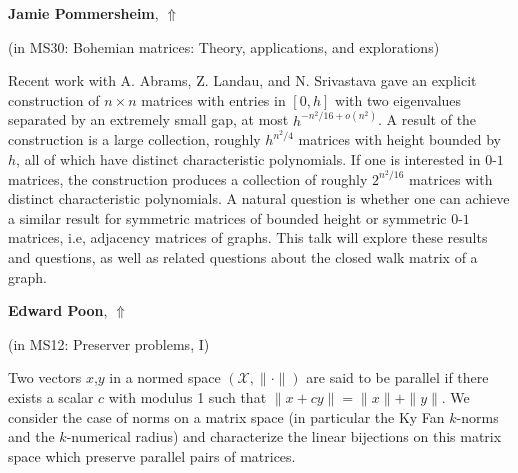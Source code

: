 \documentclass[ILAS2025-program.tex]{subfiles}
\begin{document}
\hypertarget{down0229}{}\begin{ilasabstract}
    
\textbf{Jamie Pommersheim},  \hfill \hyperlink{up0229}{$\Uparrow$}
    
    
(in {\color{mstitle}MS30: Bohemian matrices: Theory, applications, and explorations})
        
\mtskip
    Recent work with A. Abrams, Z. Landau, and N. Srivastava gave an explicit construction of $n\times n$ matrices with entries in $[0,h]$ with two eigenvalues separated by an extremely small gap, at most $h^{-n^2/16 + o(n^2)}$. A result of the construction is a large collection, roughly $h^{n^2/4}$ matrices with height bounded by $h$, all of which have distinct characteristic polynomials. If one is interested in $0$-$1$ matrices, the construction produces a collection of roughly $2^{n^2/16}$ matrices with distinct characteristic polynomials. A natural question is whether one can
achieve a similar result for symmetric matrices of bounded height or symmetric $0$-$1$ matrices, i.e, adjacency matrices of graphs. This talk will explore these results and questions, as well as related questions about the closed walk matrix of a graph.
\end{ilasabstract}
    

\hypertarget{down0017}{}\begin{ilasabstract}
    
\textbf{Edward Poon},  \hfill \hyperlink{up0017}{$\Uparrow$}
    
    
(in {\color{mstitle}MS12: Preserver problems, I})
        
\mtskip
    Two vectors $x$,$y$ in a normed space $(\mathcal{X}, \| \cdot \|)$ are said to be parallel if there exists a scalar $c$ with modulus 1 such that $\|x+c y\| = \|x\| + \|y\|$.
We consider the case of norms on a matrix space (in particular the Ky Fan $k$-norms and the $k$-numerical radius) and characterize the linear bijections on this matrix space which preserve parallel pairs of matrices.

\end{ilasabstract}
    
\end{document}
